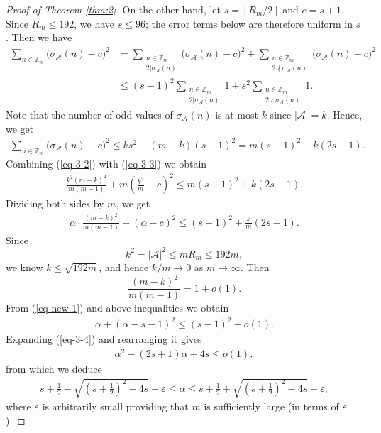 \documentclass[12pt,a4paper,reqno]{amsart}
\numberwithin{equation}{section}
\newcommand{\floor}[1]{\left\lfloor #1\right\rfloor}
\theoremstyle{plain}
\theoremstyle{definition}
\begin{document}
\begin{proof}[Proof of Theorem \ref{thm:2}]
    On the other hand, let $s=\floor{R_m/2}$ and $ c=s+1$. Since $R_m\le 192$, we have $s\le 96$; the error terms below are therefore uniform in $s$. Then we have 
    \begin{align*}
     \sum_{n\in \mathbb{Z}_m}\big(\sigma_{\mathcal{A}}(n)-c\big)^2& =\sum_{\substack{n\in \mathbb{Z}_m\\ 2| \sigma_{\mathcal{A}}(n)}}\big(\sigma_{\mathcal{A}}(n)-c\big)^2+\sum_{\substack{n\in \mathbb{Z}_m\\ 2\nmid  \sigma_{\mathcal{A}}(n)}}\big(\sigma_{\mathcal{A}}(n)-c\big)^2\\
     &\le (s-1)^2\sum_{\substack{n\in \mathbb{Z}_m\\ 2| \sigma_{\mathcal{A}}(n)}}1+s^2\sum_{\substack{n\in \mathbb{Z}_m\\ 2\nmid  \sigma_{\mathcal{A}}(n)}}1.
    \end{align*}
    Note that the number of odd values of $\sigma_{\mathcal{A}}(n)$ is at most $k$ since $|\mathcal{A}|=k$. Hence, we get
    \begin{align}\label{eq-3-3}
\sum_{n\in \mathbb{Z}_m}\big(\sigma_{\mathcal{A}}(n)-c\big)^2\le ks^2+(m-k)(s-1)^2=m(s-1)^2+k(2s-1).
    \end{align}
  Combining (\ref{eq-3-2}) with (\ref{eq-3-3}) we obtain  
  \begin{align*}
\frac{k^2(m-k)^2}{m(m-1)}+m\left(\frac{k^2}{m}-c\right)^2 \le m(s-1)^2+k(2s-1).
    \end{align*}
    Dividing both sides by $m$, we get
    \begin{align}\label{eq-new-1}
    \alpha\cdot\frac{(m-k)^2}{m(m-1)}+\left(\alpha-c\right)^2\le (s-1)^2+\frac{k}{m}(2s-1).
    \end{align}
Since 
$$
k^2=|\mathcal{A}|^2\le mR_m\le 192m, 
$$
we know $k\le \sqrt{192m}$, and hence 
$k/m\to 0$ as $m\to\infty$. 
     Then 
$$
\frac{(m-k)^2}{m(m-1)}=1+o(1).
$$    
From (\ref{eq-new-1}) and above inequalities we obtain  
    \begin{align}\label{eq-3-4}
\alpha+(\alpha-s-1)^2\le (s-1)^2+o(1).
    \end{align}
    Expanding (\ref{eq-3-4}) and rearranging it gives
    \begin{align*}
      \alpha^2-(2s+1)\alpha+4s\le o(1),  
    \end{align*}
from which we deduce 
\begin{align*}
   s+\frac{1}{2}-\sqrt{\left(s+\frac{1}{2}\right)^2-4s}-\varepsilon \le   \alpha  \le s+\frac{1}{2}+\sqrt{\left(s+\frac{1}{2}\right)^2-4s}+\varepsilon,
    \end{align*}
    where $\varepsilon$ is arbitrarily small providing that $m$ is sufficiently large (in terms of $\varepsilon$).
\end{proof}
\end{document}

